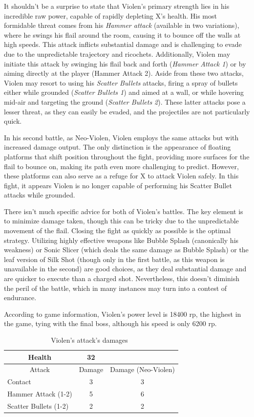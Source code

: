 It shouldn't be a surprise to state that Violen's primary strength lies in his incredible raw power, capable of rapidly depleting X's health. His most formidable threat comes from his \emph{Hammer attack} (available in two variations), where he swings his flail around the room, causing it to bounce off the walls at high speeds. This attack inflicts substantial damage and is challenging to evade due to the unpredictable trajectory and ricochets. Additionally, Violen may initiate this attack by swinging his flail back and forth (\emph{Hammer Attack 1}) or by aiming directly at the player (Hammer Attack 2). Aside from these two attacks, Violen may resort to using his \emph{Scatter Bullets} attacks, firing a spray of bullets either while grounded (\emph{Scatter Bullets 1}) and aimed at a wall, or while hovering mid-air and targeting the ground (\emph{Scatter Bullets 2}). These latter attacks pose a lesser threat, as they can easily be evaded, and the projectiles are not particularly quick.

In his second battle, as Neo-Violen, Violen employs the same attacks but with increased damage output. The only distinction is the appearance of floating platforms that shift position throughout the fight, providing more surfaces for the flail to bounce on, making its path even more challenging to predict. However, these platforms can also serve as a refuge for X to attack Violen safely. In this fight, it appears Violen is no longer capable of performing his Scatter Bullet attacks while grounded.

There isn't much specific advice for both of Violen's battles. The key element is to minimize damage taken, though this can be tricky due to the unpredictable movement of the flail. Closing the fight as quickly as possible is the optimal strategy. Utilizing highly effective weapons like Bubble Splash (canonically his weakness) or Sonic Slicer (which deals the same damage as Bubble Splash) or the leaf version of Silk Shot (though only in the first battle, as this weapon is unavailable in the second) are good choices, as they deal substantial damage and are quicker to execute than a charged shot. Nevertheless, this doesn't diminish the peril of the battle, which in many instances may turn into a contest of endurance.

According to game information, Violen's power level is 18400 rp, the highest in the game, tying with the final boss, although his speed is only 6200 rp.
\begin{table}[htp]
	\centering
	\begin{tabular}[h]{l c c}
		\toprule
		\multicolumn{1}{c}{Health}  & 32 &\\
		\midrule
		\multicolumn{1}{c}{Attack} & \multicolumn{1}{c}{Damage}& \multicolumn{1}{c}{Damage (Neo-Violen)}\\
		Contact & 3 & 3\\
		Hammer Attack (1-2) & 5& 6\\
		Scatter Bullets (1-2) & 2& 2\\
		\bottomrule
	\end{tabular}
	\caption{Violen's attack's damages~\cite{wiki:Violen,book:Compendium}}
\end{table}

